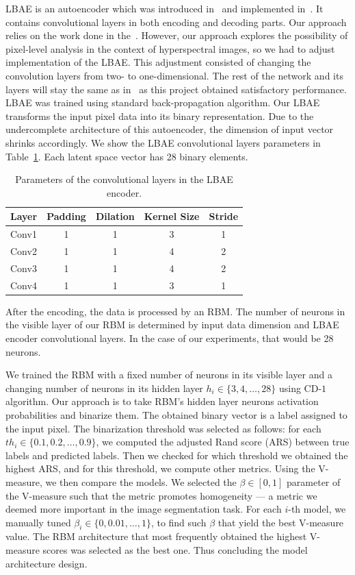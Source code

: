 \documentclass[runningheads]{llncs}
\begin{document}
LBAE is an autoencoder which was introduced in~\cite{fajtl2020} and implemented
in~\cite{QBM4EO}. It contains convolutional layers in both encoding and decoding
parts. Our approach relies on the work done in the~\cite{QBM4EO}. However, our
approach explores the possibility of pixel-level analysis in the context of
hyperspectral images, so we had to adjust~\cite{QBM4EO} implementation of the
LBAE. This adjustment consisted of changing the convolution layers from two- to
one-dimensional. The rest of the network and its layers will stay the same as
in~\cite{QBM4EO} as this project obtained satisfactory performance. LBAE was
trained using standard back-propagation algorithm. Our LBAE transforms the input
pixel data into its binary representation. Due to the undercomplete architecture
of this autoencoder, the dimension of input vector shrinks accordingly. We show
the LBAE convolutional layers parameters in Table~\ref{tab:conv_params}. Each
latent space vector has 28 binary elements.
\begin{table}[ht]
    \centering
    \caption{Parameters of the convolutional layers in the LBAE encoder.}
    \begin{tabular}{@{}lcccc@{}}
    \toprule
    Layer & Padding & Dilation & Kernel Size & Stride \\ \midrule
    Conv1 & 1       & 1        & 3           & 1      \\
    Conv2 & 1       & 1        & 4           & 2      \\
    Conv3 & 1       & 1        & 4           & 2      \\
    Conv4 & 1       & 1        & 3           & 1      \\ \bottomrule
    \end{tabular}
    \label{tab:conv_params}
\end{table}
After the encoding, the data is processed by an RBM. The number of neurons in
the visible layer of our RBM is determined by input data dimension and LBAE
encoder convolutional layers. In the case of our experiments, that would be 28
neurons. 

We trained the RBM with a fixed number of neurons in its visible layer and a
changing number of neurons in its hidden layer $h_i \in \{3, 4, \ldots, 28\}$
using CD-$1$ algorithm. Our approach is to take RBM's hidden layer neurons
activation probabilities and binarize them. The obtained binary vector is a
label assigned to the input pixel. The binarization threshold was selected as
follows: for each $th_i \in \{0.1, 0.2, \ldots, 0.9\}$, we computed the
adjusted Rand score (ARS) between true labels and predicted labels. Then we
checked for which threshold we obtained the highest ARS, and for this threshold,
we compute other metrics. Using the V-measure, we then compare the models. We
selected the $\beta \in [0,1]$ parameter of the V-measure such that the metric
promotes homogeneity --- a metric we deemed more important in the image
segmentation task. For each $i$-th model, we manually tuned $\beta_i \in \{0,
0.01, \ldots, 1\}$, to find such $\beta$ that yield the best V-measure value.
The RBM architecture that most frequently obtained the highest V-measure scores
was selected as the best one. Thus concluding the model architecture design. 
\end{document}
